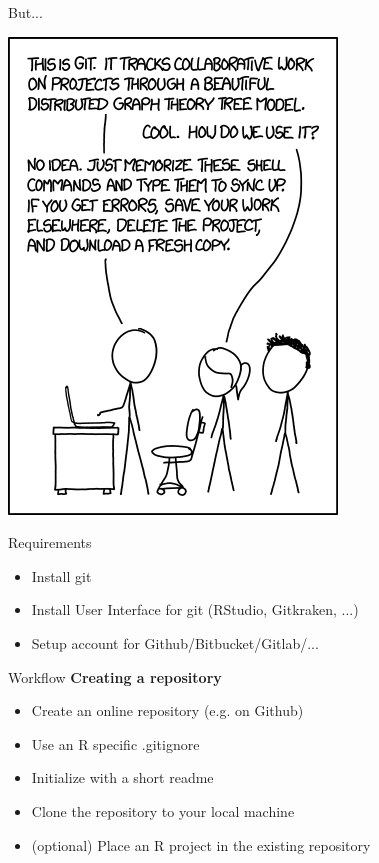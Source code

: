 \documentclass[xcolor=table]{beamer}\usepackage[]{graphicx}\usepackage[]{color}
\begin{document}
\begin{frame}{But...}
\begin{center}
\includegraphics[height=.75\textheight]{git_no_idea.png}
\end{center}
\end{frame}

\begin{frame}{Requirements}
\begin{itemize}
  \item Install git 
  \item Install User Interface for git (RStudio, Gitkraken, ...)
  \item Setup account for Github/Bitbucket/Gitlab/...
\end{itemize}
\end{frame}

\begin{frame}{Workflow}
\textbf{Creating a repository}
\begin{itemize}
  \item Create an online repository (e.g. on Github)
  \item Use an R specific .gitignore
  \item Initialize with a short readme
  \item Clone the repository to your local machine
  \item (optional) Place an R project in the existing repository
\end{itemize}
\end{frame}
\end{document}
